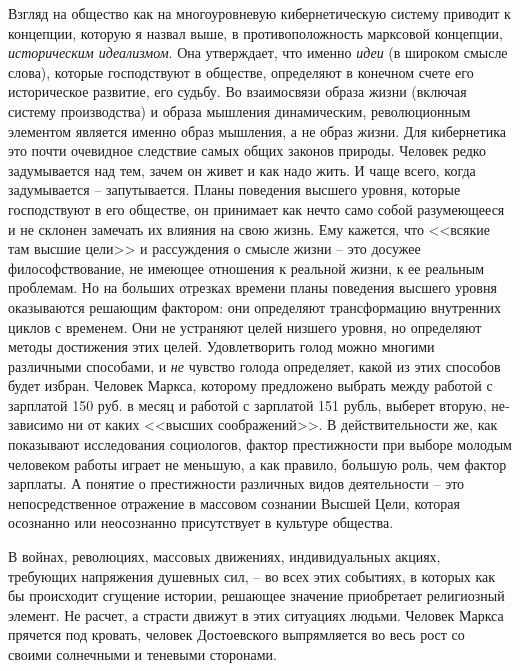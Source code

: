 \documentclass{book}
\begin{document}
Взгляд на общество как на многоуровневую кибернетиче­скую систему приводит к концепции, которую я назвал выше, в противоположность марксовой концепции, \textit{историческим идеализмом}.  Она утверждает, что именно \textit{идеи}  (в широком смысле слова), которые господствуют в обществе, определяют в конечном счете его историческое развитие, его судьбу. Во взаимосвязи образа жизни (включая систему производства) и образа мышления динамическим, революционным элемен­том является именно образ мышления, а не образ жизни. Для кибернетика это почти очевидное следствие самых общих зако­нов природы. Человек редко задумывается над тем, зачем он живет и как надо жить. И чаще всего, когда задумывается -- запутывается. Планы поведения высшего уровня, которые господствуют в его обществе, он принимает как нечто само собой разумеющееся и не склонен замечать их влияния на свою жизнь. Ему кажется, что <<всякие там высшие цели>> и рассуж­дения о смысле жизни -- это досужее философствование, не имеющее отношения к реальной жизни, к ее реальным 
пробле­мам. Но на больших отрезках времени планы поведения выс­шего уровня оказываются решающим фактором: они опреде­ляют трансформацию внутренних циклов с временем. Они не устраняют целей низшего уровня, но определяют методы до­стижения этих целей. Удовлетворить голод можно многими различными способами, и \textit{не}  чувство голода определяет, ка­кой из этих способов будет избран. Человек Маркса, которо­му предложено выбрать между работой с зарплатой 150 руб. в месяц и работой с зарплатой 151 рубль, выберет вторую, не­зависимо ни от каких <<высших соображений>>. В действительности же, как показывают исследования социологов, фактор престижности при выборе молодым человеком работы играет не меньшую, а как правило, большую роль, чем фактор зарплаты. А понятие о престижности различных видов деятель­ности -- это непосредственное отражение в массовом сознании Высшей Цели, которая осознанно или неосознанно присутствует в культуре общества.

В войнах, революциях, массовых движениях, индивидуаль­ных акциях, требующих напряжения душевных сил, -- во всех этих событиях, в которых как бы происходит сгущение истории, решающее значение приобретает религиозный элемент. Не расчет, а страсти движут в этих ситуациях людьми. Человек Маркса прячется под кровать, человек Достоевского выпрямляется во весь рост со своими солнечными и теневыми сторонами.
\end{document}
